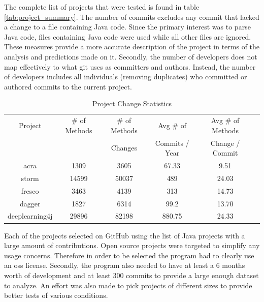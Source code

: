 The complete list of projects that were tested is found in table \ref{tab:project_summary}. The number of commits excludes any commit that lacked a change to a file containing Java code. Since the primary interest was to parse Java code, files containing Java code were used while all other files are ignored. These measures provide a more accurate description of the project in terms of the analysis and predictions made on it. Secondly, the number of developers does not map effectively to what git uses as committers and authors. Instead, the number of developers includes all individuals (removing duplicates) who committed or authored commits to the current project.


\begin{table}
\begin{center}
    \begin{tabular}{|c|c|c|c|c|c|}
        \hline
        Project & \# of Methods & \# of Methods & Avg \# of & Avg \# of Methods \\
         & & Changes & Commits / Year & Change / Commit \\
        \hline
        acra & 1309 & 3605 & 67.33 & 9.51 \\
        storm & 14599 & 50037 & 489 & 24.03 \\
        fresco & 3463 & 4139 & 313 & 14.73 \\
        dagger & 1827 & 6314 & 99.2 & 13.70 \\
        deeplearning4j & 29896 & 82198 & 880.75 & 24.33 \\
        \hline
    \end{tabular}
\end{center}
\caption{Project Change Statistics}
\label{tab:project_stats}
\end{table}

Each of the projects selected on GitHub using the list of Java projects with a large amount of contributions. Open source projects were targeted to simplify any usage concerns. Therefore in order to be selected the program had to clearly use an \gls{oss} license. Secondly, the program also needed to have at least a 6 months worth of development and at least 300 commits to provide a large enough dataset to analyze. An effort was also made to pick projects of different sizes to provide better tests of various conditions.

